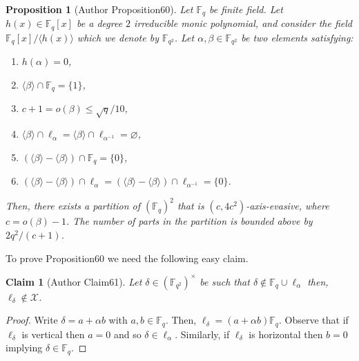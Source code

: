 \documentclass[10pt,a4paper]{article}
\newtheorem{ntproposition}[nttheorem]{Proposition}
\newtheorem{ntclaim}[nttheorem]{Claim}
\begin{document}
\begin{ntproposition}[Author Proposition60]
Let $\mathbb F_q$ be finite field. Let $h(x)\in\mathbb F_q[x]$ be a degree $2$ irreducible monic polynomial, and consider the field $\mathbb F_q[x]/\langle h(x)\rangle$ which we denote by $\mathbb F_{q^2}$. Let $\alpha,\beta\in\mathbb F_{q^2}$ be two elements satisfying:
\begin{enumerate}
\item $h(\alpha)=0$,
\item $\langle\beta\rangle\cap\mathbb F_q=\{1\}$,
\item $c+1=o(\beta)\leq\sqrt q/10$,
\item $\langle\beta\rangle\cap\ell_\alpha=\langle\beta\rangle\cap\ell_{\alpha^{-1}}=\varnothing$,
\item $(\langle\beta\rangle-\langle\beta\rangle)\cap\mathbb F_q=\{0\}$,
\item $(\langle\beta\rangle-\langle\beta\rangle)\cap\ell_\alpha=(\langle\beta\rangle-\langle\beta\rangle)\cap\ell_{\alpha^{-1}}=\{0\}$.
\end{enumerate}
Then, there exists a partition of $(\mathbb F_q)^2$ that is $(c,4c^2)$-axis-evasive, where $c=o(\beta)-1$. The number of parts in the partition is bounded above by $2q^2/(c+1)$.
\end{ntproposition}
To prove Proposition60 we need the following easy claim.
\begin{ntclaim}[Author Claim61]
Let $\delta\in(\mathbb F_{q^2})^\times$ be such that $\delta\notin\mathbb F_q\cup\ell_\alpha$ then, $\ell_\delta\notin\mathcal X$.
\end{ntclaim}
\begin{proof}
Write $\delta=a+\alpha b$ with $a,b\in\mathbb F_q$. Then, $\ell_\delta=(a+\alpha b)\mathbb F_q$. Observe that if $\ell_\delta$ is vertical then $a=0$ and so $\delta\in\ell_\alpha$. Similarly, if $\ell_\delta$ is horizontal then $b=0$ implying $\delta\in\mathbb F_q$.
\end{proof}
\end{document}

